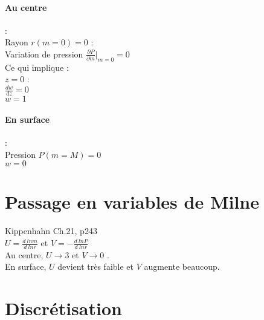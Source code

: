 \documentclass[a4paper,10pt]{article}
\begin{document}
\paragraph{Au centre}: \\
Rayon $r(m=0)=0$ : \\
Variation de pression $\frac{\partial P}{\partial m}\vert_{m=0} = 0$\\
Ce qui implique :\\
$z=0$ :\\
$\frac{dw}{dz}=0$\\
$w=1$

\paragraph{En surface}: \\
Pression $P(m=M)=0$\\

$w=0$

\section{Passage en variables de Milne}
Kippenhahn Ch.21, p243\\
$U=\frac{d~ln m}{d~ln r} $ et $V=-\frac{d~ln P}{d~lnr}$\\
Au centre, $U \rightarrow 3$ et $V \rightarrow 0$ .\\
En surface, $U$ devient très faible et $V$ augmente beaucoup.

\section{Discrétisation}
%
%
\end{document}
